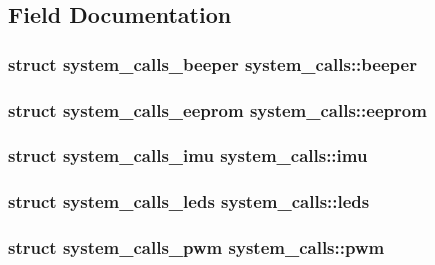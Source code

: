 \subsection{Field Documentation}
\hypertarget{structsystem__calls_a108f8087c3772e175668406c0e3e1ec3}{
\subsubsection[{beeper}]{\setlength{\rightskip}{0pt plus 5cm}struct {\bf system\+\_\+calls\+\_\+beeper} system\+\_\+calls\+::beeper}}\label{structsystem__calls_a108f8087c3772e175668406c0e3e1ec3}
\hypertarget{structsystem__calls_af476786414333a8f426f53466baa6442}{
\subsubsection[{eeprom}]{\setlength{\rightskip}{0pt plus 5cm}struct {\bf system\+\_\+calls\+\_\+eeprom} system\+\_\+calls\+::eeprom}}\label{structsystem__calls_af476786414333a8f426f53466baa6442}
\hypertarget{structsystem__calls_a4490cb0eaa873cba708463e22663ea6a}{
\subsubsection[{imu}]{\setlength{\rightskip}{0pt plus 5cm}struct {\bf system\+\_\+calls\+\_\+imu} system\+\_\+calls\+::imu}}\label{structsystem__calls_a4490cb0eaa873cba708463e22663ea6a}
\hypertarget{structsystem__calls_af053d7e0b93ca5f53cc70c7706cdf32e}{
\subsubsection[{leds}]{\setlength{\rightskip}{0pt plus 5cm}struct {\bf system\+\_\+calls\+\_\+leds} system\+\_\+calls\+::leds}}\label{structsystem__calls_af053d7e0b93ca5f53cc70c7706cdf32e}
\hypertarget{structsystem__calls_a456d662f1dbaa4230d019172ebe7abce}{
\subsubsection[{pwm}]{\setlength{\rightskip}{0pt plus 5cm}struct {\bf system\+\_\+calls\+\_\+pwm} system\+\_\+calls\+::pwm}}\label{structsystem__calls_a456d662f1dbaa4230d019172ebe7abce}
